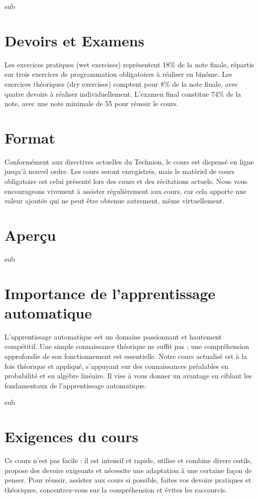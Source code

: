 \documentclass[12pt]{article}
\begin{document}
sub\section{Devoirs et Examens}

Les exercices pratiques (wet exercises) représentent 18\% de la note finale, répartis sur trois exercices de programmation obligatoires à réaliser en binôme. Les exercices théoriques (dry exercises) comptent pour 8\% de la note finale, avec quatre devoirs à réaliser individuellement. L'examen final constitue 74\% de la note, avec une note minimale de 55 pour réussir le cours.

\section{Format}

Conformément aux directives actuelles du Technion, le cours est dispensé en ligne jusqu'à nouvel ordre. Les cours seront enregistrés, mais le matériel de cours obligatoire est celui présenté lors des cours et des récitations actuels. Nous vous encourageons vivement à assister régulièrement aux cours, car cela apporte une valeur ajoutée qui ne peut être obtenue autrement, même virtuellement.

\section{Aperçu}

sub\section{Importance de l'apprentissage automatique}

L'apprentissage automatique est un domaine passionnant et hautement compétitif. Une simple connaissance théorique ne suffit pas ; une compréhension approfondie de son fonctionnement est essentielle. Notre cours actualisé est à la fois théorique et appliqué, s'appuyant sur des connaissances préalables en probabilité et en algèbre linéaire. Il vise à vous donner un avantage en ciblant les fondamentaux de l'apprentissage automatique.

sub\section{Exigences du cours}

Ce cours n'est pas facile : il est intensif et rapide, utilise et combine divers outils, propose des devoirs exigeants et nécessite une adaptation à une certaine façon de penser. Pour réussir, assistez aux cours si possible, faites vos devoirs pratiques et théoriques, concentrez-vous sur la compréhension et évitez les raccourcis.
\end{document}
